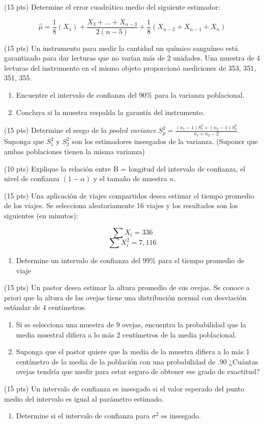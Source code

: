 \documentclass[addpoints]{exam}
\theoremstyle{mytheor}
\begin{document}
  \begin{questions} 
  \question (15 pts) Determine el error cuadrático medio del siguiente estimador:
  
  $$\hat{\mu} = \frac{1}{8} (X_1) + \frac{X_3+...+X_{n-3}}{2(n-5)} + \frac{1}{8} (X_{n-2}+X_{n-1}+X_{n}) $$
  
  \question (15 pts) Un instrumento para medir la cantidad un químico sanguíneo está garantizado para dar lecturas que no varían más de 2 unidades. Una muestra de 4 lecturas del instrumento en el mismo objeto proporcionó mediciones de 353, 351, 351, 355. 
  
  \begin{enumerate}
  \item Encuentre el intervalo de confianza del 90\% para la varianza poblacional.
  \item Concluya si la muestra respalda la garantía del instrumento.
  \end{enumerate}
   
  
  \question (15 pts) Determine el sesgo de la \textit{pooled variance} $S_p^2 = \frac{(n_1-1) S_1^2 + (n_2-1) S_2^2}{n_1 + n_2 -2}$. Suponga que $S_1^2$ y $S_2^2$ son los estimadores insesgados de la varianza. (Suponer que ambas poblaciones tienen la misma varianza)

  \question (10 pts) Explique la relación entre B = longitud del intervalo de confianza, el nivel de confianza $(1-\alpha)$ y el tamaño de muestra $n$.
  
  \question (15 pts) Una aplicación de viajes compartidos desea estimar el tiempo promedio de los viajes. Se selecciona aleatoriamente 16 viajes y los resultados son los siguientes (en minutos):
  
  $$\sum X_i = 336$$ $$ \sum X_i^2 = 7,116$$
  
  \begin{enumerate}
\item Determine un intervalo de confianza del 99\% para el tiempo promedio de viaje
  \end{enumerate}
  
  \question (15 pts) Un pastor desea estimar la altura promedio de sus ovejas. Se conoce a priori que la altura de las ovejas tiene una distribución normal con desviación estándar de 4 centímetros. 
  \begin{enumerate}
  \item Si se selecciona una muestra de 9 ovejas, encuentra la probabilidad que la media muestral difiera a lo más 2 centímetros de la media poblacional.
  \item Suponga que el pastor quiere que la media de la muestra difiera a lo más 1 centímetro de la media de la población con una probabilidad de .90 ¿Cuántas ovejas tendría que medir para estar seguro de obtener ese grado de exactitud?
  \end{enumerate}
  
  

\question (15 pts) Un intervalo de confianza es insesgado si el valor esperado del punto medio del intervalo es igual al parámetro estimado. 
\begin{enumerate}
\item Determine si el intervalo de confianza para $\sigma^2$ es insesgado.
\end{enumerate}

\end{questions}
  
\end{document}
